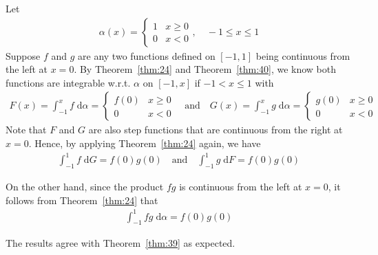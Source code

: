 \documentclass[thmcnt=section, 12pt]{my-elegantbook}
\begin{document}
\begin{example}
    Let
    \begin{align*}
        \alpha(x)
        = \begin{cases}
              1 & x \geq 0 \\
              0 & x < 0
          \end{cases},
        \quad
        -1 \leq x \leq 1
    \end{align*}
    Suppose $f$ and $g$ are any two functions defined on $[-1, 1]$ being continuous from the left at $x=0$. By Theorem~\ref{thm:24} and Theorem~\ref{thm:40}, we know both functions are integrable w.r.t. $\alpha$ on $[-1, x]$ if $-1 < x \leq 1$ with
    \begin{align*}
        F(x) = \int_{-1}^x f \; \mathrm{d}\alpha = \begin{cases}
                                                       f(0) & x \geq 0 \\
                                                       0    & x < 0
                                                   \end{cases}
        \quad \text{and} \quad
        G(x) = \int_{-1}^x g \; \mathrm{d}\alpha = \begin{cases}
                                                       g(0) & x \geq 0 \\
                                                       0    & x < 0
                                                   \end{cases}
    \end{align*}
    Note that $F$ and $G$ are also step functions that are continuous from the right at $x = 0$. Hence, by applying Theorem~\ref{thm:24} again, we have
    \begin{align*}
        \int_{-1}^{1} f \; \mathrm{d}G = f(0)g(0)
        \quad \text{and} \quad
        \int_{-1}^{1} g \; \mathrm{d}F = f(0)g(0)
    \end{align*}

    On the other hand, since the product $f g$ is continuous from the left at $x=0$, it follows from Theorem~\ref{thm:24} that \begin{align*}
        \int_{-1}^{1} f g \; \mathrm{d}\alpha
        = f(0)g(0)
    \end{align*}

    The results agree with Theorem~\ref{thm:39} as expected.
\end{example}


\end{document}
